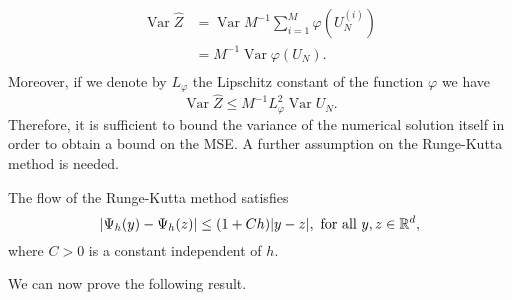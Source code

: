 \documentclass{siamart1116}
\numberwithin{theorem}{section}
\DeclarePairedDelimiter{\abs}{\lvert}{\rvert}
\renewcommand{\phi}{\varphi}
\newcommand{\R}{\mathbb{R}}
\newcommand{\Var}{\operatorname{Var}}
\newcommand{\sksum}{\textstyle\sum}
\begin{document}
\begin{equation}
\begin{aligned}
	\Var\hat Z &= \Var M^{-1} \sksum_{i = 1}^M \phi(U_N^{(i)}) \\
	&= M^{-1} \Var\phi\left(U_N\right). \\
\end{aligned}
\end{equation}
Moreover, if we denote by $L_\phi$ the Lipschitz constant of the function $\phi$ we have
\begin{equation}\label{eq:BoundOfVarHatZ}
	\Var\hat Z \leq M^{-1} L_\phi^2 \Var U_N.
\end{equation}
Therefore, it is sufficient to bound the variance of the numerical solution itself in order to obtain a bound on the MSE. A further assumption on the Runge-Kutta method is needed.
\begin{assumption}\label{ass:AssumptionRK} The flow of the Runge-Kutta method satisfies
	\begin{equation}
		\abs{\Psi_h(y) - \Psi_h(z)} \leq (1 + Ch)\abs{y - z}, \text{ for all } y, z \in \R^d,
	\end{equation}
	where $C > 0$ is a constant independent of $h$.
\end{assumption}
We can now prove the following result.
\end{document}

